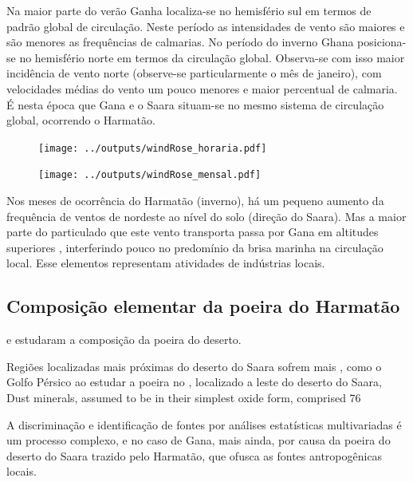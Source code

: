 Na maior parte do verão Ganha localiza-se no hemisfério sul em termos de padrão global 
de circulação. Neste período as intensidades de vento são maiores e são menores as 
frequências de calmarias. No período do inverno Ghana posiciona-se no hemisfério
 norte em termos da circulação global. 
Observa-se com isso maior incidência de vento norte (observe-se particularmente o mês 
de janeiro), com velocidades médias do vento um pouco menores e maior percentual de 
calmaria. É nesta época que Gana e o Saara situam-se no mesmo sistema de circulação 
global, ocorrendo o Harmatão. 

\begin{figure}[H]
  \centering
  \texttt{[image: ../outputs/windRose\_horaria.pdf]}
  \caption{ \citep{carslaw2012} \label{fig:windRose_horaria}}%
\end{figure}

\begin{figure}[H]
  \centering
  \texttt{[image: ../outputs/windRose\_mensal.pdf]}
  \caption{ \citep{carslaw2012} \label{fig:windRose_mensal}}
\end{figure}

Nos meses de ocorrência do Harmatão (inverno), há um pequeno aumento da frequência de ventos de nordeste ao nível do solo (direção do Saara). Mas a maior parte do particulado que este vento transporta passa por Gana 
em altitudes superiores \citep{breuning2005}, interferindo pouco no predomínio da brisa marinha na circulação local.%
%
Esse elementos representam atividades de indústrias locais. 

\newpage
\subsection{Composição elementar da poeira do Harmatão}

\cite{engelbrecht2009a} e \citep{engelbrecht2009b} estudaram a composição 
da poeira do deserto.

Regiões localizadas mais próximas do deserto do Saara sofrem mais 
, como o Golfo Pérsico
\citet{kaku2016} ao estudar a poeira no , localizado a leste do 
deserto do Saara,  
Dust minerals, assumed to be in
their simplest oxide form, comprised 76%


A discriminação e identificação de fontes por análises estatísticas 
multivariadas é um processo complexo, e no caso de Gana, mais ainda, 
por causa da poeira do deserto do Saara trazido pelo Harmatão, que ofusca 
as fontes antropogênicas locais.

